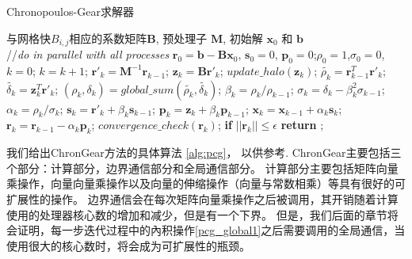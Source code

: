 \begin{algorithm}[!t]
\caption{Chronopoulos-Gear求解器}
\label{alg:pcg}
\begin{algorithmic}[1]
\REQUIRE   与网格快$B_{i,j}$相应的系数矩阵$\textbf{B}$, 预处理子 $\textbf{M}$, 初始解 $\textbf{x}_0$ 和 $\textbf{b}$  \\
//\qquad    \textit{do in parallel with all processes}
\STATE $\textbf{r}_0 = \textbf{b}-\textbf{B}\textbf{x}_0$, $\textbf{s}_0 =0$, $\textbf{p}_0 =0$;\quad $\rho_0=1$,$\sigma_0=0$, $k=0$;
\STATE $k=k+1$;
\STATE $\textbf{r}'_{k} =\textbf{M}^{-1}\textbf{r}_{k-1}$; \label{pcg_scale0} 
\STATE $\textbf{z}_k = \textbf{B}\textbf{r}'_{k}$; \label{pcg_mat}
\STATE $update\_halo(\textbf{z}_{k})$;  \label{pcg_bc1}
\STATE $\tilde{\rho_k} = \textbf{r}_{k-1}^T\textbf{r}'_{k}$;\label{pcg_dot1}
\STATE $\tilde{\delta_k} = \textbf{z}_k^T\textbf{r}'_k$;\label{pcg_dot2}
\STATE $(\rho_k,\delta_k) = global\_sum(\tilde{\rho_k},\tilde{\delta_k})$;\label{pcg_global1} 
\STATE $\beta_k = \rho_k / \rho_{k-1}$;\label{pcg_beta}
\STATE $\sigma_k = \delta_k - \beta_k^2\sigma_{k-1}$;\label{pcg_sigma}
\STATE $\alpha_k = \rho_k /\sigma_{k}$;\label{pcg_alpha}
\STATE $\textbf{s}_k = \textbf{r}'_{k} +\beta_k\textbf{s}_{k-1}$;\label{pcg_scale1}
\STATE $\textbf{p}_k = \textbf{z}_{k} +\beta_k\textbf{p}_{k-1}$;\label{pcg_scale2}
\STATE $\textbf{x}_k =\textbf{x}_{k-1} +\alpha_k \textbf{s}_k$;\label{pcg_scale3}
\STATE $\textbf{r}_k =\textbf{r}_{k-1} -\alpha_k\textbf{p}_k$;\label{pcg_scale4}
\STATE $convergence\_check(\textbf{r}_{k})$;  
\STATE \textbf{if} $||\textbf{r}_k|| \le \epsilon$  \textbf{return} ;
\ENDIF
\ENDWHILE
\end{algorithmic}
\end{algorithm}

我们给出ChronGear方法的具体算法
\ref{alg:pcg}， 以供参考.  ChronGear主要包括三个部分：计算部分，边界通信部分和全局通信部分。
计算部分主要包括矩阵向量乘操作，向量向量乘操作以及向量的伸缩操作（向量与常数相乘）等具有很好的可扩展性的操作。 
边界通信会在每次矩阵向量乘操作之后被调用，其开销随着计算使用的处理器核心数的增加和减少，但是有一个下界。 
但是，我们后面的章节将会证明，每一步迭代过程中的內积操作\ref{pcg_global1}之后需要调用的全局通信，当使用很大的核心数时，将会成为可扩展性的瓶颈。
 

